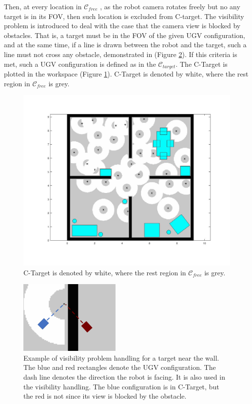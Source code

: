 \documentclass[12pt,draftcls,onecolumn]{IEEEtran}
\begin{document}
Then, at every location in $\mathcal{C}_{free}$ , as the robot camera rotates freely but no any target is in its FOV, then such location is excluded from C-target.
The visibility problem is introduced to deal with the case that the camera view is blocked by obstacles.
That is, a target must be in the FOV of the given UGV configuration, and at the same time, if a line is drawn between the robot and the target, such a line must not cross any obstacle, demonstrated in  (Figure \ref{fig:7}).
If this criteria is met, such a UGV configuration is defined as in the  $\mathcal{C}_{target}$.
The C-Target is plotted in the workspace (Figure \ref{fig:5}).
C-Target is denoted by white, where the rest region in $\mathcal{C}_{free}$ is grey. 








\begin{figure}
 \centering
  \includegraphics[width=18cm]{figures/CTarget}
  \caption{C-Target is denoted by white, where the rest region in $\mathcal{C}_{free}$ is grey.}
  \label{fig:5}
\end{figure}


\begin{figure}
 \centering
  \includegraphics[width=5cm]{figures/visibility_eg}
  \caption{Example of visibility problem handling for a target near the wall. The blue and red rectangles denote the UGV configuration. The dash line denotes the direction the robot is facing. It is also used in the visibility handling. The blue configuration is in C-Target, but the red is not since its view is blocked by the obstacle.}
  \label{fig:7}
\end{figure}
\end{document}
